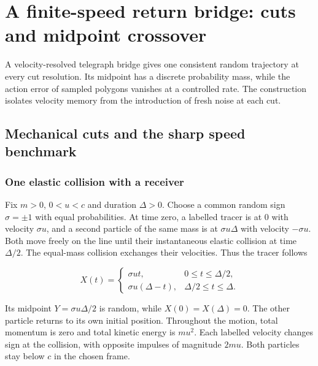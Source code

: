 \documentclass[11pt,a4paper]{article}
\begin{document}
\hypertarget{a-finite-speed-return-bridge-cuts-and-midpoint-crossover}{%
\section{A finite-speed return bridge: cuts and midpoint
crossover}\label{a-finite-speed-return-bridge-cuts-and-midpoint-crossover}}

A velocity-resolved telegraph bridge gives one consistent random
trajectory at every cut resolution. Its midpoint has a discrete
probability mass, while the action error of sampled polygons vanishes at
a controlled rate. The construction isolates velocity memory from the
introduction of fresh noise at each cut.

\hypertarget{mechanical-cuts-and-the-sharp-speed-benchmark}{%
\subsection{Mechanical cuts and the sharp speed
benchmark}\label{mechanical-cuts-and-the-sharp-speed-benchmark}}

\hypertarget{one-elastic-collision-with-a-receiver}{%
\subsubsection{One elastic collision with a
receiver}\label{one-elastic-collision-with-a-receiver}}

Fix \(m>0\), \(0<u<c\) and duration \(\Delta>0\). Choose a common random
sign \(\sigma=\pm1\) with equal probabilities. At time zero, a labelled
tracer is at \(0\) with velocity \(\sigma u\), and a second particle of
the same mass is at \(\sigma u\Delta\) with velocity \(-\sigma u\). Both
move freely on the line until their instantaneous elastic collision at
time \(\Delta/2\). The equal-mass collision exchanges their velocities.
Thus the tracer follows

\[X(t)=\begin{cases}\sigma ut,&0\le t\le\Delta/2,\\
\sigma u(\Delta-t),&\Delta/2\le t\le\Delta.\end{cases}\]

Its midpoint \(Y=\sigma u\Delta/2\) is random, while
\(X(0)=X(\Delta)=0\). The other particle returns to its own initial
position. Throughout the motion, total momentum is zero and total
kinetic energy is \(mu^2\). Each labelled velocity changes sign at the
collision, with opposite impulses of magnitude \(2mu\). Both particles
stay below \(c\) in the chosen frame.
\end{document}
